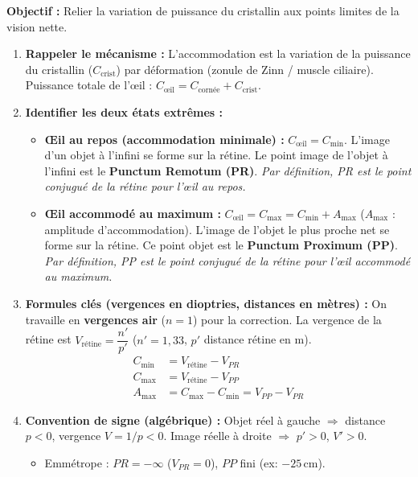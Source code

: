\documentclass[11pt]{article}
\begin{document}
\begin{methode}
\textbf{Objectif :} Relier la variation de puissance du cristallin aux points limites de la vision nette.
\begin{enumerate}
    \item \textbf{Rappeler le mécanisme :} L'accommodation est la variation de la puissance du cristallin ($C_{\text{crist}}$) par déformation (zonule de Zinn / muscle ciliaire). Puissance totale de l'œil : $C_{\text{œil}} = C_{\text{cornée}} + C_{\text{crist}}$.
    \item \textbf{Identifier les deux états extrêmes :}
    \begin{itemize}
        \item \textbf{Œil au repos (accommodation minimale) :} $C_{\text{œil}} = C_{\text{min}}$. L'image d'un objet à l'infini se forme sur la rétine. Le point image de l'objet à l'infini est le \textbf{Punctum Remotum (PR)}. \emph{Par définition, PR est le point conjugué de la rétine pour l'œil au repos.}
        \item \textbf{Œil accommodé au maximum :} $C_{\text{œil}} = C_{\text{max}} = C_{\text{min}} + A_{\text{max}}$ ($A_{\text{max}}$ : amplitude d'accommodation). L'image de l'objet le plus proche net se forme sur la rétine. Ce point objet est le \textbf{Punctum Proximum (PP)}. \emph{Par définition, PP est le point conjugué de la rétine pour l'œil accommodé au maximum.}
    \end{itemize}
    \item \textbf{Formules clés (vergences en dioptries, distances en mètres) :}
    On travaille en \textbf{vergences air} ($n=1$) pour la correction. La vergence de la rétine est $V_{\text{rétine}} = \dfrac{n'}{p'}$ ($n'=1,33$, $p'$ distance rétine en m).
    \begin{align*}
        C_{\text{min}} &= V_{\text{rétine}} - V_{PR} \\
        C_{\text{max}} &= V_{\text{rétine}} - V_{PP} \\
        A_{\text{max}} &= C_{\text{max}} - C_{\text{min}} = V_{PP} - V_{PR}
    \end{align*}
    \item \textbf{Convention de signe (algébrique) :} Objet réel à gauche $\Rightarrow$ distance $p < 0$, vergence $V = 1/p < 0$. Image réelle à droite $\Rightarrow$ $p' > 0$, $V' > 0$.
    \begin{itemize}
        \item Emmétrope : $PR = -\infty$ ($V_{PR}=0$), $PP$ fini (ex: $-25\,\text{cm}$).

\end{itemize}
\end{enumerate}
\end{methode}
\end{document}
